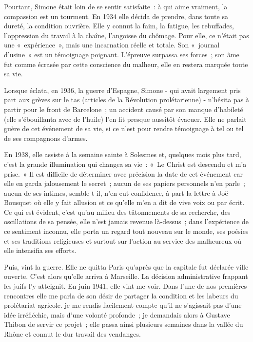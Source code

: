 \documentclass[french,twoside]{book} %
\begin{document}
Pourtant, Simone était loin de se sentir satisfaite : à qui aime vraiment, la compassion est un tourment. En 1934 elle décida de prendre, dans toute sa dureté, la condition ouvrière. Elle y connut la faim, la fatigue, les rebuffades, l'oppression du travail à la chaîne, l'angoisse du chômage. Pour elle, ce n'était pas une « expérience », mais une incarnation réelle et totale. Son « journal d'usine » est un témoignage poignant. L'épreuve surpassa ses forces ; son âme fut comme écrasée par cette conscience du malheur, elle en restera marquée toute sa vie.\par
Lorsque éclata, en 1936, la guerre d'Espagne, Simone - qui avait largement pris part aux grèves sur le tas (articles de la Révolution prolétarienne) - n'hésita pas à partir pour le front de Barcelone ; un accident causé par son manque d'habileté (elle s'ébouillanta avec de l'huile) l'en fit presque aussitôt évacuer. Elle ne parlait guère de cet événement de sa vie, si ce n'est pour rendre témoignage à tel ou tel de ses compagnons d'armes.\par
En 1938, elle assiste à la semaine sainte à Solesmes et, quelques mois plus tard, c'est la grande illumination qui changea sa vie : « Le Christ est descendu et m'a prise. » Il est difficile de déterminer avec précision la date de cet événement car elle en garda jalousement le secret ; aucun de ses papiers personnels n'en parle ; aucun de ses intimes, semble-t-il, n'en eut confidence, à part la lettre à Joë Bousquet où elle y fait allusion et ce qu'elle m'en a dit de vive voix ou par écrit. Ce qui est évident, c'est qu'au milieu des tâtonnements de sa recherche, des oscillations de sa pensée, elle n'est jamais revenue là-dessus ; dans l'expérience de ce sentiment inconnu, elle porta un regard tout nouveau sur le monde, ses poésies et ses traditions religieuses et surtout sur l'action au service des malheureux où elle intensifia ses efforts.\par
Puis, vint la guerre. Elle ne quitta Paris qu'après que la capitale fut déclarée ville ouverte. C'est alors qu'elle arriva à Marseille. La décision administrative frappant les juifs l'y atteignit. En juin 1941, elle vint me voir. Dans l'une de nos premières rencontres elle me parla de son désir de partager la condition et les labeurs du prolétariat agricole. je me rendis facilement compte qu'il ne s'agissait pas d'une idée irréfléchie, mais d'une volonté profonde ; je demandais alors à Gustave Thibon de servir ce projet ; elle passa ainsi plusieurs semaines dans la vallée du Rhône et connut le dur travail des vendanges.\par
\end{document}
